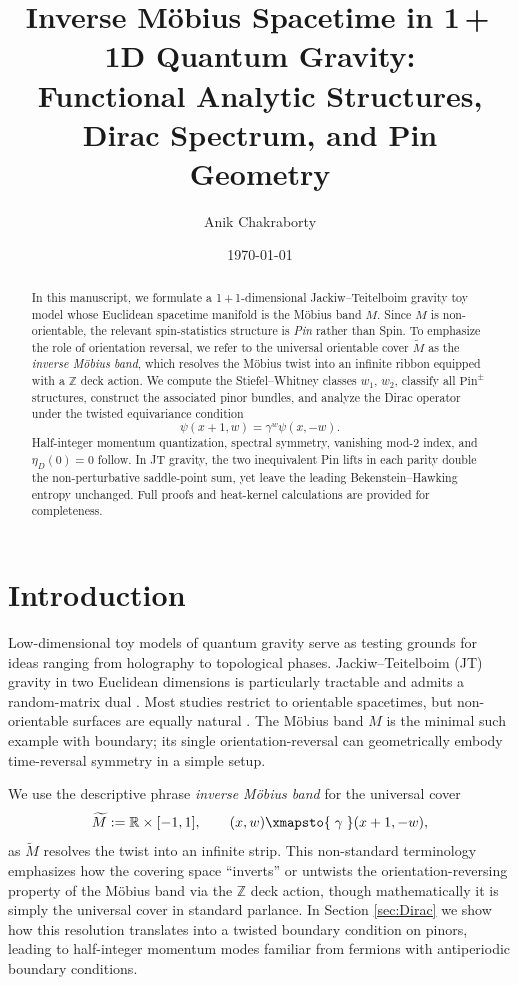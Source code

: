 \documentclass[11pt]{amsart}
\title[1+1D Möbius-Twisted Toy Model]{Inverse Möbius Spacetime in 1\,+\,1D Quantum Gravity:\\ Functional Analytic Structures, Dirac Spectrum, and Pin Geometry}
\author{Anik Chakraborty}
\date{\today}
\theoremstyle{definition}
\theoremstyle{remark}
\newcommand{\RR}{\mathbb{R}}
\newcommand{\ZZ}{\mathbb{Z}}
\newcommand{\wt}{\widetilde}
\begin{document}
\begin{abstract}
In this manuscript, we formulate a 1\,+\,1-dimensional Jackiw–Teitelboim gravity toy model whose Euclidean spacetime manifold is the Möbius band $M$. Since $M$ is non-orientable, the relevant spin-statistics structure is \emph{Pin} rather than Spin. To emphasize the role of orientation reversal, we refer to the universal orientable cover $\widetilde{M}$ as the \emph{inverse Möbius band}, which resolves the Möbius twist into an infinite ribbon equipped with a $\mathbb{Z}$ deck action. We compute the Stiefel–Whitney classes $w_1$, $w_2$, classify all $\mathrm{Pin}^{\pm}$ structures, construct the associated pinor bundles, and analyze the Dirac operator under the twisted equivariance condition
\[
\psi(x+1, w) = \gamma^w \psi(x, -w).
\]
Half-integer momentum quantization, spectral symmetry, vanishing mod-2 index, and $\eta_D(0) = 0$ follow. In JT gravity, the two inequivalent Pin lifts in each parity double the non-perturbative saddle-point sum, yet leave the leading Bekenstein–Hawking entropy unchanged. Full proofs and heat-kernel calculations are provided for completeness.
\end{abstract}

\maketitle

\section{Introduction}

Low-dimensional toy models of quantum gravity serve as testing grounds for ideas ranging from holography to topological phases.  Jackiw–Teitelboim (JT) gravity in two Euclidean dimensions is particularly tractable and admits a random-matrix dual \cite{SaadShenkerStanford,StanfordWitten}.  Most studies restrict to orientable spacetimes, but non-orientable surfaces are equally natural \cite{Weber2024}.  The Möbius band $M$ is the minimal such example with boundary; its single orientation-reversal can geometrically embody time-reversal symmetry in a simple setup.

We use the descriptive phrase \emph{inverse Möbius band} for the universal cover
\[
\wt{M}:=\RR\times[-1,1],\qquad
(x,w)\xmapsto{\;\gamma\;}(x+1,-w),
\]
as $\wt M$ resolves the twist into an infinite strip. This non-standard terminology emphasizes how the covering space ``inverts'' or untwists the orientation-reversing property of the Möbius band via the $\ZZ$ deck action, though mathematically it is simply the universal cover in standard parlance. In Section \ref{sec:Dirac} we show how this resolution translates into a twisted boundary condition on pinors, leading to half-integer momentum modes familiar from fermions with antiperiodic boundary conditions.
\end{document}
